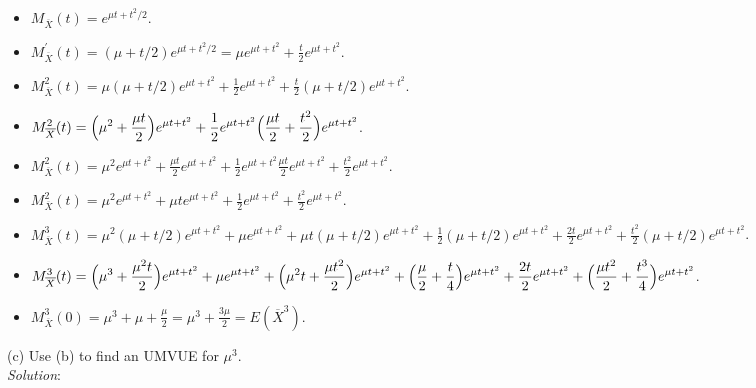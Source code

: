 \documentclass[12pt]{article}
\newcommand{\ds}{\displaystyle}
\begin{document}
\begin{itemize}
    \item $ \ds M_{\overline{X}}(t) = e^{\mu t + t^{2} / 2 } $.
    \item $ \ds M_{\overline{X}}^{'}(t) = (\mu + t/2)e^{\mu t + t^{2} / 2 } = \mu e^{\mu t + t^{2}} + \frac{t}{2} e^{\mu t + t^{2}} $.
    \item $ \ds M_{\overline{X}}^{2}(t) = \mu (\mu + t/2) e^{\mu t + t^{2}} + \frac{1}{2} e^{\mu t + t^{2}} + \frac{t}{2} (\mu + t/2) e^{\mu t + t^{2}} $.
    \item $ \ds M_{\overline{X}}^{2}(t) = \Bigl( \mu^{2} + \frac{\mu t}{2} \Bigr) e^{\mu t + t^{2}} + \frac{1}{2} e^{\mu t + t^{2}}  \Bigl( \frac{\mu t}{2} + \frac{t^{2}}{2} \Bigr) e^{\mu t + t^{2}} $.
    \item $ \ds M_{\overline{X}}^{2}(t) = \mu^{2} e^{\mu t + t^{2}} + \frac{\mu t}{2} e^{\mu t + t^{2}} + \frac{1}{2} e^{\mu t + t^{2}}  \frac{\mu t}{2} e^{\mu t + t^{2}} + \frac{t^{2}}{2} e^{\mu t + t^{2}} $.
    \item $ \ds M_{\overline{X}}^{2}(t) = \mu^{2} e^{\mu t + t^{2}} + \mu t e^{\mu t + t^{2}} + \frac{1}{2} e^{\mu t + t^{2}} + \frac{t^{2}}{2} e^{\mu t + t^{2}} $.
    \item $ \ds M_{\overline{X}}^{3}(t) = \mu^{2} (\mu + t/2) e^{\mu t + t^{2}} + \mu e^{\mu t + t^{2}} + \mu t (\mu + t/2) e^{\mu t + t^{2}} + \frac{1}{2} (\mu + t/2) e^{\mu t + t^{2}} + \frac{2t}{2} e^{\mu t + t^{2}} + \frac{t^{2}}{2} (\mu + t/2) e^{\mu t + t^{2}} $.
    \item $ \ds M_{\overline{X}}^{3}(t) =  \Bigl( \mu^{3} + \frac{\mu^{2} t}{2} \Bigr) e^{\mu t + t^{2}} + \mu e^{\mu t + t^{2}} + \Bigl( \mu^{2}t + \frac{\mu t^{2}}{2} \Bigr) e^{\mu t + t^{2}} + \Bigl( \frac{\mu}{2} + \frac{t}{4} \Bigr) e^{\mu t + t^{2}} + \frac{2t}{2} e^{\mu t + t^{2}} + \Bigl( \frac{\mu t^{2}}{2} + \frac{t^{3}}{4} \Bigr) e^{\mu t + t^{2}} $.
    \item $ \ds M_{\overline{X}}^{3}(0) =  \mu^{3} + \mu + \frac{\mu}{2} = \mu^{3} + \frac{3\mu}{2} = E(\overline{X}^{3}) $.
\end{itemize}

\vspace{2.5mm}

(c) Use (b) to find an UMVUE for $ \mu^{3} $.
\vspace{2.5mm} \\
\textit{Solution}:
\vspace{2.5mm} \\
\end{document}
